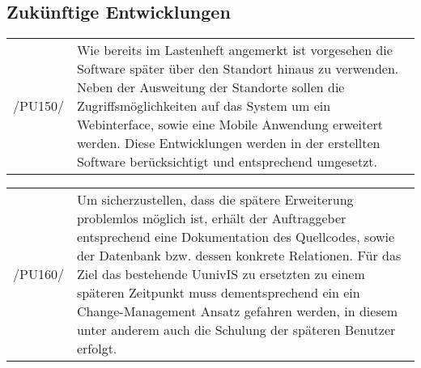 \subsection{Zukünftige Entwicklungen}
\label{subsec:zukunftentw}

\begin{tabular}{p{1.5cm}p{14.5cm}}

	 /PU150/	&  Wie bereits im Lastenheft angemerkt ist vorgesehen die Software später über den Standort hinaus zu verwenden.
Neben der Ausweitung der Standorte sollen die Zugriffsmöglichkeiten auf das System um ein Webinterface, sowie eine Mobile Anwendung erweitert werden.
Diese Entwicklungen werden in der erstellten Software berücksichtigt und entsprechend umgesetzt.\\[0.25cm]


\end{tabular}

\begin{tabular}{p{1.5cm}p{14.5cm}}

	 /PU160/	&  Um sicherzustellen, dass die spätere Erweiterung problemlos möglich ist, erhält der Auftraggeber entsprechend eine Dokumentation des Quellcodes, sowie der Datenbank bzw. dessen konkrete Relationen.
Für das Ziel das bestehende UunivIS zu ersetzten zu einem späteren Zeitpunkt muss dementsprechend ein ein Change-Management Ansatz gefahren werden, in diesem unter anderem auch die Schulung der späteren Benutzer erfolgt.\\[0.25cm]


\end{tabular}


